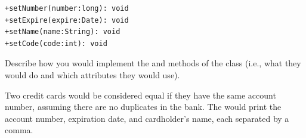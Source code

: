 \begin{answer}[5em]
\begin{verbatim}
+setNumber(number:long): void
+setExpire(expire:Date): void
+setName(name:String): void
+setCode(code:int): void
\end{verbatim}
\end{answer}


\Q Describe how you would implement the  and  methods of the  class (i.e., what they would do and which attributes they would use).

\begin{answer}[5em]
Two credit cards would be considered equal if they have the same account number, assuming there are no duplicates in the bank.
The  would print the account number, expiration date, and cardholder's name, each separated by a comma.
\end{answer}
